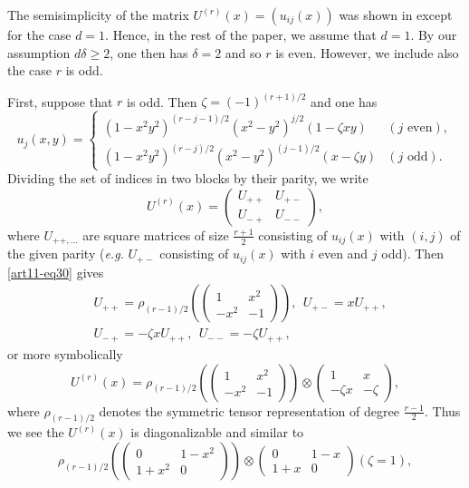 The semisimplicity of the matrix $U^{(r)}(x)=(u_{ij}(x))$ was shown in \cite{art11-keySF} except for the case $d=1$. Hence, in the rest of the paper, we assume that $d=1$. By our assumption $d\delta\geq 2$, one then has $\delta=2$ and so $r$ is even. However, we include also the case $r$ is odd.

First, suppose that $r$ is odd. Then $\zeta=(-1)^{(r+1)/2}$ and one has
\begin{equation}
u_{j}(x,y)=
\begin{cases}
(1-x^{2}y^{2})^{(r-j-1)/2}(x^{2}-y^{2})^{j/2}(1-\zeta xy) & (j\text{~even}),\\
(1-x^{2}y^{2})^{(r-j)/2}(x^{2}-y^{2})^{(j-1)/2}(x-\zeta y) & (j\text{~odd}).
\end{cases}\label{art11-eq30}
\end{equation}
Dividing the set of indices in two blocks by their parity, we write
$$
U^{(r)}(x)=
\left(
\begin{matrix}
U_{++} & U_{+-}\\
U_{-+} & U_{--}
\end{matrix}
\right),
$$
where $U_{++,\ldots}$ are square matrices of size $\frac{r+1}{2}$ consisting of $u_{ij}(x)$ with $(i,j)$ of the given parity ({\em e.g.} $U_{+-}$ consisting of $u_{ij}(x)$ with $i$ even and $j$ odd). Then \eqref{art11-eq30} gives
\begin{align*}
&U_{++}=\rho_{(r-1)/2}\left(\left(
\begin{matrix}
1 & x^{2}\\
-x^{2} & -1
\end{matrix}
\right)\right), \ \ U_{+-}=xU_{++},\\
&U_{-+}=-\zeta xU_{++}, \ \ U_{--}=-\zeta U_{++},
\end{align*}
or more symbolically
\begin{equation}
U^{(r)}(x)=\rho_{(r-1)/2}\left(\left(
\begin{matrix}
1 & x^{2}\\
-x^{2} & -1
\end{matrix}
\right)\right)
\otimes 
\left(
\begin{matrix}
1 & x\\
-\zeta x & -\zeta
\end{matrix}
\right),\label{art11-eq31}
\end{equation}
where $\rho_{(r-1)/2}$ denotes the symmetric tensor representation of degree $\frac{r-1}{2}$. Thus we see the $U^{(r)}(x)$ is diagonalizable and similar to
$$
\rho_{(r-1)/2}\left(\left(
\begin{matrix}
0 & 1-x^{2}\\
1+x^{2} & 0
\end{matrix}
\right)\right)\otimes
\left(
\begin{matrix}
0 & 1-x\\
1+x & 0
\end{matrix}
\right)(\zeta=1),
$$
